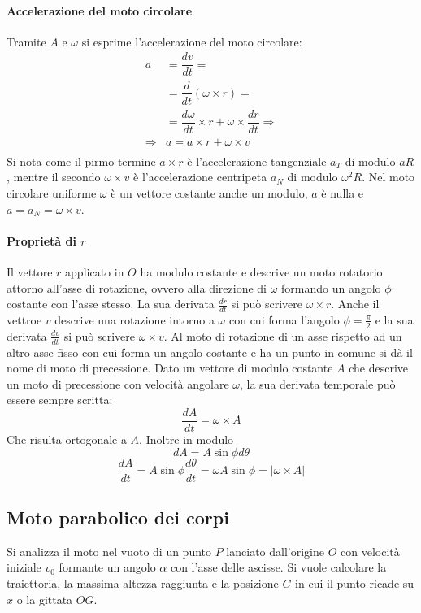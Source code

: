 			\paragraph{Accelerazione del moto circolare}
			Tramite $A$ e $\omega$ si esprime l'accelerazione del moto circolare:
			\begin{align*}
				a&=\dfrac{dv}{dt}=\\
				 &=\dfrac{d}{dt}(\omega\times r)=\\
				 &=\dfrac{d\omega}{dt}\times r + \omega\times\dfrac{dr}{dt}\Rightarrow\\
				\Rightarrow&a=a\times r+\omega\times v\\
			\end{align*}
			Si nota come il pirmo termine $a\times r$ \`e l'accelerazione tangenziale $a_T$ di modulo $aR$, mentre il secondo $\omega\times v$ \`e l'accelerazione centripeta $a_N$ di modulo $\omega^2R$.
			Nel moto circolare uniforme $\omega$ \`e un vettore costante anche un modulo, $a$ \`e nulla e $a=a_N=\omega\times v$.

			\paragraph{Propriet\`a di $r$}
			Il vettore $r$ applicato in $O$ ha modulo costante e descrive un moto rotatorio attorno all'asse di rotazione, ovvero alla direzione di $\omega$ formando un angolo $\phi$ costante con l'asse stesso.
			La sua derivata $\frac{dr}{dt}$ si pu\`o scrivere $\omega\times r$.
			Anche il vettroe $v$ descrive una rotazione intorno a $\omega$ con cui forma l'angolo $\phi=\frac{\pi}{2}$ e la sua derivata $\frac{dv}{dt}$ si pu\`o scrivere $\omega\times v$.
			Al moto di rotazione di un asse rispetto ad un altro asse fisso con cui forma un angolo costante e ha un punto in comune si d\`a il nome di moto di precessione.
			Dato un vettore di modulo costante $A$ che descrive un moto di precessione con velocit\`a angolare $\omega$, la sua derivata temporale pu\`o essere sempre scritta:
			$$\dfrac{dA}{dt}=\omega\times A$$
			Che risulta ortogonale a $A$.
			Inoltre in modulo
			$$dA=A\sin\phi d\theta$$
			$$\dfrac{dA}{dt}=A\sin\phi\dfrac{d\theta}{dt}=\omega A\sin\phi=|\omega\times A|$$

	\subsection{Moto parabolico dei corpi}
	Si analizza il moto nel vuoto di un punto $P$ lanciato dall'origine $O$ con velocit\`a iniziale $v_0$ formante un angolo $\alpha$ con l'asse delle ascisse.
	Si vuole calcolare la traiettoria, la massima altezza raggiunta e la posizione $G$ in cui il punto ricade su $x$ o la gittata $OG$.

